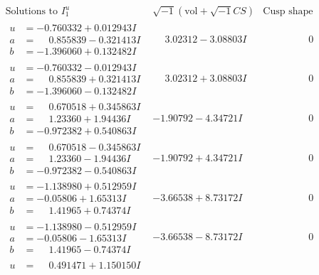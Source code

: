 \documentclass[1p]{elsarticle_modified}
\theoremstyle{definition}
\newcommand{\I}{\sqrt{-1}}
\begin{document}
$$\begin{array}{c|c|c}
\text{Solutions to }I^u_{1}& \I (\text{vol} + \sqrt{-1}CS) & \text{Cusp shape}\\
 \hline 
\begin{aligned}
u &= -0.760332 + 0.012943 I \\
a &= \phantom{-}0.855839 - 0.321413 I \\
b &= -1.396060 + 0.132482 I\end{aligned}
 & \phantom{-}3.02312 - 3.08803 I & \phantom{-0.000000 } 0 \\ \hline\begin{aligned}
u &= -0.760332 - 0.012943 I \\
a &= \phantom{-}0.855839 + 0.321413 I \\
b &= -1.396060 - 0.132482 I\end{aligned}
 & \phantom{-}3.02312 + 3.08803 I & \phantom{-0.000000 } 0 \\ \hline\begin{aligned}
u &= \phantom{-}0.670518 + 0.345863 I \\
a &= \phantom{-}1.23360 + 1.94436 I \\
b &= -0.972382 + 0.540863 I\end{aligned}
 & -1.90792 - 4.34721 I & \phantom{-0.000000 } 0 \\ \hline\begin{aligned}
u &= \phantom{-}0.670518 - 0.345863 I \\
a &= \phantom{-}1.23360 - 1.94436 I \\
b &= -0.972382 - 0.540863 I\end{aligned}
 & -1.90792 + 4.34721 I & \phantom{-0.000000 } 0 \\ \hline\begin{aligned}
u &= -1.138980 + 0.512959 I \\
a &= -0.05806 + 1.65313 I \\
b &= \phantom{-}1.41965 + 0.74374 I\end{aligned}
 & -3.66538 + 8.73172 I & \phantom{-0.000000 } 0 \\ \hline\begin{aligned}
u &= -1.138980 - 0.512959 I \\
a &= -0.05806 - 1.65313 I \\
b &= \phantom{-}1.41965 - 0.74374 I\end{aligned}
 & -3.66538 - 8.73172 I & \phantom{-0.000000 } 0 \\ \hline\begin{aligned}
u &= \phantom{-}0.491471 + 1.150150 I \\

\end{aligned}
\end{array}$$
\end{document}
